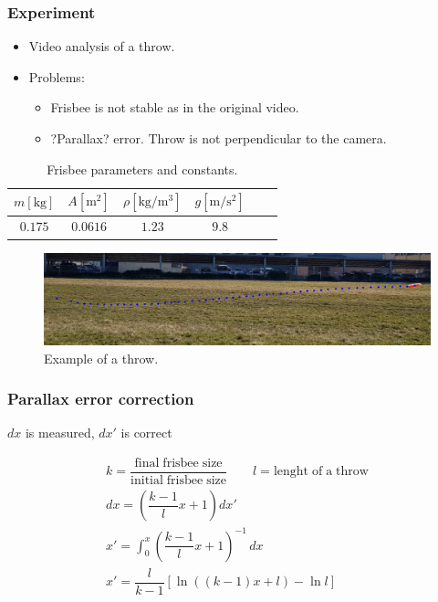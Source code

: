 \documentclass{beamer}
\begin{document}

\begin{frame}

\frametitle{Experiment}

\begin{itemize}
\item Video analysis of a throw.
\item Problems:
\begin{itemize}
\item Frisbee is not stable as in the original video.
\item ?Parallax? error. Throw is not perpendicular to the camera.
\end{itemize}
\end{itemize}

\begin{table}
\begin{tabular}{|c|c|c|c|c|c|}
\hline 
$m [\mathrm{kg}]$ & $A [\mathrm{m^2}]$ & $\rho [\mathrm{kg/m^3}]$ &  $g [\mathrm{m / s^2}]$ \\ 
\hline 
$0.175$ & $0.0616$ & $1.23$ & $9.8$ \\ 
\hline 
\end{tabular}
\caption{Frisbee parameters and constants.}
\end{table} 

\begin{figure}[H]
	\centering
	  \includegraphics[width=\textwidth]{primer_meta.png}
	  \caption{Example of a throw.}
\end{figure}

\end{frame}


\begin{frame}

\frametitle{Parallax error correction}

\(dx\) is measured, \(dx'\) is correct

\begin{gather}
k = \dfrac{\mathrm{final \; frisbee \; size}}{\mathrm{initial \;  frisbee  \; size}} \qquad l = \mathrm{lenght \; of \; a \; throw}\\
dx = \left( \dfrac{k - 1}{l} x + 1 \right) dx' \\
x' = \int_{0}^{x} \left( \dfrac{k - 1}{l} x + 1 \right)^{-1} \,dx \\
x' = \dfrac{l}{k - 1} \left[ \ln((k - 1) x + l) - \ln l \right]
\end{gather}

\end{frame}
\end{document}
